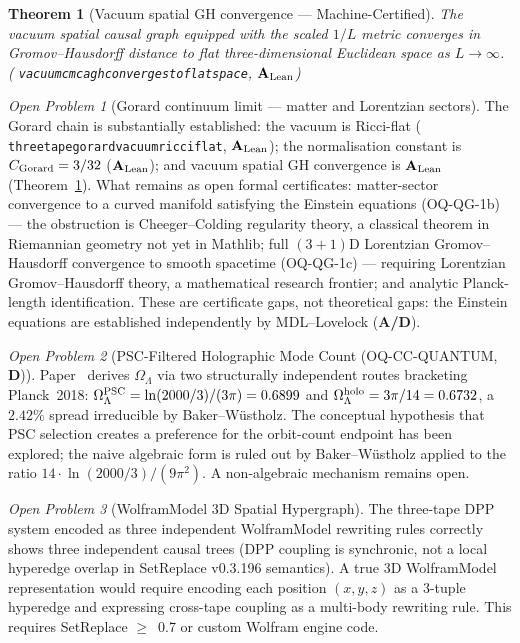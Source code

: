 \documentclass[11pt]{article}
\newtheorem{theorem}{Theorem}[section]
\theoremstyle{remark}
\newtheorem{openprob}{Open Problem}
\newcommand{\lean}[1]{%
  \penalty-100
  \begingroup\def\_{\textunderscore\allowbreak}\texttt{#1}\endgroup}
\newcommand{\CMCA}{\text{CMCA}}
\newcommand{\CatAL}{\texorpdfstring{\ensuremath{\textbf{A}_{\rm Lean}}}{A-Lean}}
\newcommand{\CatAD}{\textbf{A/D}}
\newcommand{\CatD}{\textbf{D}}
\begin{document}
\begin{theorem}[Vacuum \CMCA{} spatial GH convergence --- Machine-Certified]
\label{thm:vacuum_gh_p49}
The vacuum \CMCA{} spatial causal graph equipped with the scaled $1/L$ metric
converges in Gromov--Hausdorff distance to flat three-dimensional Euclidean space
as $L\to\infty$.\\
(\lean{vacuum\_cmca\_gh\_converges\_to\_flat\_space}, \CatAL)
\end{theorem}

\begin{openprob}[Gorard continuum limit --- matter and Lorentzian sectors]
The Gorard chain is substantially established: the \CMCA{} vacuum is Ricci-flat
(\lean{three\_tape\_gorard\_vacuum\_ricci\_flat}, \CatAL); the normalisation
constant is $C_{\rm Gorard} = 3/32$ (\CatAL); and vacuum spatial GH convergence
is \CatAL{} (Theorem~\ref{thm:vacuum_gh_p49}). What remains as open formal
certificates: matter-sector convergence to a curved manifold satisfying the
Einstein equations (OQ-QG-1b) --- the obstruction is Cheeger--Colding regularity
theory, a classical theorem in Riemannian geometry not yet in Mathlib; full
$(3{+}1)$D Lorentzian Gromov--Hausdorff convergence to smooth spacetime
(OQ-QG-1c) --- requiring Lorentzian Gromov--Hausdorff theory, a mathematical
research frontier; and analytic Planck-length identification. These are
certificate gaps, not theoretical gaps: the Einstein equations are established
independently by MDL--Lovelock (\CatAD).
\cite{SpivackCompleteness,SpivackQGR,SpivackThreeTapeCMCA}
\end{openprob}

\begin{openprob}[PSC-Filtered Holographic Mode Count (OQ-CC-QUANTUM, \CatD{})]
Paper~\cite{SpivackGTECosmology} derives $\Omega_\Lambda$ via two structurally
independent routes bracketing Planck~2018:
$\Omega_\Lambda^{\rm PSC} = \ln(2000/3)/(3\pi) = 0.6899$ and
$\Omega_\Lambda^{\rm holo} = 3\pi/14 = 0.6732$, a $2.42\%$ spread
irreducible by Baker--W\"ustholz. The conceptual hypothesis that PSC selection
creates a preference for the orbit-count endpoint has been explored; the naive
algebraic form is ruled out by Baker--W\"ustholz applied to the ratio
$14 \cdot \ln(2000/3)/(9\pi^2)$. A non-algebraic mechanism remains open.
\end{openprob}

\begin{openprob}[WolframModel 3D Spatial Hypergraph]
The three-tape DPP system encoded as three independent WolframModel rewriting
rules correctly shows three independent causal trees (DPP coupling is
synchronic, not a local hyperedge overlap in SetReplace v0.3.196 semantics).
A true 3D WolframModel representation would require encoding each position
$(x,y,z)$ as a 3-tuple hyperedge and expressing cross-tape coupling as a
multi-body rewriting rule. This requires SetReplace ${\geq}$~0.7 or custom
Wolfram engine code.
\end{openprob}
\end{document}
